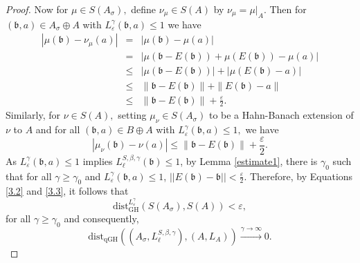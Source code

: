\documentclass[a4paper,11pt,reqno]{amsart}
\theoremstyle{plain}
\theoremstyle{mainthmstyle}
\theoremstyle{named}
\numberwithin{equation}{section}
\newcommand{\bea}{\begin{eqnarray}}
\newcommand{\eea}{\end{eqnarray}}
\begin{document}
\begin{proof}
Now for $\mu \in S (A_{\sigma}),$ define $\nu_{\mu} \in S (A)$ by $\nu_{\mu} = \mu \rvert_A.$ Then for $(\mathfrak {b}, a) \in A_{\sigma} \oplus A$ with $L_{\varepsilon}^{\gamma} (\mathfrak {b}, a) \leq 1$ we have
\bea\label{3.2}
\left \lvert \mu (\mathfrak {b}) - \nu_{\mu} (a) \right \rvert & = & \left \lvert \mu (\mathfrak {b}) - \mu (a) \right \rvert \nonumber \\ & = & \left \lvert \mu (\mathfrak {b} - E (\mathfrak {b})) + \mu (E (\mathfrak {b})) - \mu (a) \right \rvert \nonumber \\ & \leq & \left \vert \mu (\mathfrak {b} - E (\mathfrak {b}))  \right \rvert + \left \lvert \mu (E (\mathfrak {b}) - a) \right \rvert \nonumber \\ & \leq & \|\mathfrak {b} - E (\mathfrak {b})\| + \|E (\mathfrak {b}) - a \| \nonumber \\ & \leq & \|\mathfrak {b} - E (\mathfrak {b})\| + \frac {\varepsilon} {2}. 
\eea
Similarly, for $\nu \in S (A),$ setting $\mu_{\nu} \in S \left (A_{\sigma} \right )$ to be a Hahn-Banach extension of $\nu$ to $A$ and for all $(\mathfrak {b}, a) \in B \oplus A$ with $L_{\varepsilon}^{\gamma} (\mathfrak {b} , a) \leq 1,$ we have
\begin{equation}\label{3.3} \left \lvert \mu_{\nu} (\mathfrak {b}) - \nu (a) \right \rvert \leq \|\mathfrak {b} - E (\mathfrak {b})\| + \frac {\varepsilon} {2}. \end{equation}
As $L^{\gamma}_{\varepsilon}(\mathfrak{b},a)\leq 1$ implies $L^{S,\beta,\gamma}_{\ell}(\mathfrak{b})\leq 1$,  by Lemma \ref{estimate1}, there is $\gamma_0$ such that for all $\gamma\geq\gamma_0$ and $L^{\gamma}_{\varepsilon}(\mathfrak{b},a)\leq 1$, $\lvert\lvert E(\mathfrak{b})-\mathfrak{b}\rvert\rvert<\frac{\varepsilon}{2}$. Therefore, by Equations \ref{3.2} and \ref{3.3}, it follows that $$\mathrm{dist}_{\mathrm {GH}}^{L_{\varepsilon}^{\gamma}} \left (S \left (A_{\sigma} \right ), S (A) \right ) < \varepsilon,$$ for all $\gamma\geq\gamma_0$ and consequently, $$\mathrm{dist}_{\mathrm{qGH}} \left (\left (A_{\sigma}, L_{\ell}^{S, \beta, \gamma} \right ), \left (A, L_A \right ) \right ) \xrightarrow{\gamma \rightarrow \infty} 0.$$

\end{proof}



\end{document}
